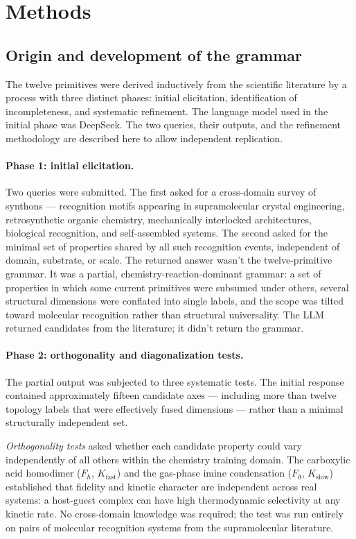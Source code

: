 \documentclass[12pt,a4paper]{article}
\begin{document}
\section{Methods}
\label{sec:methods}

\subsection{Origin and development of the grammar}

The twelve primitives were derived inductively from the scientific
literature by a process with three distinct phases: initial
elicitation, identification of incompleteness, and systematic
refinement. The language model used in the initial phase was
DeepSeek. The two queries, their outputs, and the refinement
methodology are described here to allow independent replication.

\paragraph{Phase 1: initial elicitation.}
Two queries were submitted. The first asked for a cross-domain survey
of synthons --- recognition motifs appearing in supramolecular crystal
engineering, retrosynthetic organic chemistry, mechanically interlocked
architectures, biological recognition, and self-assembled systems.
The second asked for the minimal set of properties shared by all such
recognition events, independent of domain, substrate, or scale.
The returned answer wasn't the twelve-primitive grammar. It was a
partial, chemistry-reaction-dominant grammar: a set of properties in
which some current primitives were subsumed under others, several
structural dimensions were conflated into single labels, and the
scope was tilted toward molecular recognition rather than structural
universality. The LLM returned candidates from the literature; it
didn't return the grammar.

\paragraph{Phase 2: orthogonality and diagonalization tests.}
The partial output was subjected to three systematic tests.
The initial response contained approximately fifteen candidate axes ---
including more than twelve topology labels that were effectively fused
dimensions --- rather than a minimal structurally independent set.

\emph{Orthogonality tests} asked whether each candidate property could
vary independently of all others within the chemistry training domain.
The carboxylic acid homodimer ($F_\hbar$, $K_{\text{fast}}$) and the
gas-phase imine condensation ($F_{\eth}$, $K_{\text{slow}}$) established
that fidelity and kinetic character are independent across real systems:
a host-guest complex can have high thermodynamic selectivity at any
kinetic rate. No cross-domain knowledge was required; the test was run
entirely on pairs of molecular recognition systems from the
supramolecular literature.
\end{document}
